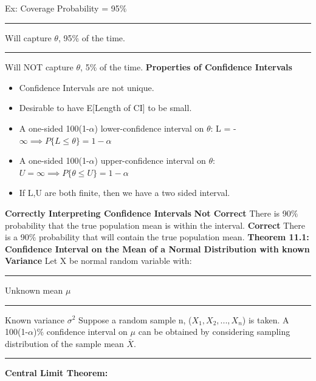\documentclass[]{article}
\begin{document}
\newline
\newline Ex: Coverage Probability = 95$\%$
\newline\Large\rule{1.3cm}{0pt} Will capture $\theta$, 95$\%$ of the time.
\newline\Large\rule{1.3cm}{0pt} Will NOT capture $\theta$, 5$\%$ of the time.
\newline
\newline\Large\textbf{Properties of Confidence Intervals}
\begin{itemize}
	\item Confidence Intervals are not unique.
	\item Desirable to have E[Length of CI] to be small.
	\item A one-sided 100(1-$\alpha$) lower-confidence interval on $\theta$:  L = -$\infty  \implies P\{ L \le \theta \} = 1-\alpha$
	\item A one-sided 100(1-$\alpha$) upper-confidence interval on $\theta$: $U = \infty  \implies P\{ \theta \le U \} = 1-\alpha$
	\item If L,U are both finite, then we have a two sided interval.
\end{itemize}
\Large\textbf{Correctly Interpreting Confidence Intervals}
\newline \textbf{Not Correct}
\newline There is 90$\%$ probability that the true population mean is within the interval.
\newline \textbf{Correct}
\newline There is a 90$\%$ probability that  will contain the true population mean.
\newline
\newline
\Large\textbf{Theorem 11.1: Confidence Interval on the Mean of a Normal Distribution with known Variance}
\newline Let X be normal random variable with:
\newline\Large\rule{1.3cm}{0pt} Unknown mean $\mu$
\newline\Large\rule{1.3cm}{0pt} Known variance $\sigma ^2$
\newline Suppose a random sample n, ($X_1, X_2,...,X_n$) is taken.
\newline A 100(1-$\alpha$)$\%$ confidence interval on $\mu$ can be obtained by considering sampling distribution of the sample mean $\bar{X}$.
\newline
\newline\Large\rule{1.3cm}{0pt}\textbf{Central Limit Theorem:} 
\end{document}
